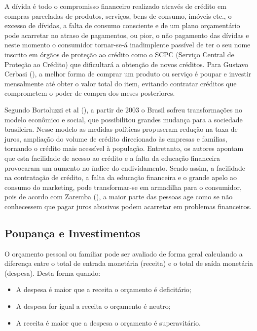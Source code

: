 A dívida é todo o compromisso financeiro realizado através de crédito em compras parceladas de produtos, serviços, bens de consumo, imóveis etc., o excesso de dívidas, a falta de consumo consciente e de um plano orçamentário pode acarretar no atraso de pagamentos, ou pior, o não pagamento das dívidas e neste momento o consumidor tornar-se-á inadimplente passível de ter o seu nome inscrito em órgãos de proteção ao crédito como o SCPC (Serviço Central de Proteção ao Crédito) que dificultará a obtenção de novos créditos. Para Gustavo Cerbasi (\citeyear{cerbasi2015}), a melhor forma de comprar um produto ou serviço é poupar e investir mensalmente até obter o valor total do item, evitando contratar créditos que comprometem o poder de compra dos meses posteriores.

Segundo Bortoluzzi et al (\citeyear{bortoluzzi2015}), a partir de 2003 o Brasil sofreu transformações no modelo econômico e social, que possibilitou grandes mudança para a sociedade brasileira. Nesse modelo as medidas políticas propuseram redução na taxa de juros, ampliação do volume de crédito direcionado às empresas e famílias, tornando o crédito mais acessível à população. Entretanto, os autores apontam que esta facilidade de acesso ao crédito e a falta da educação financeira provocaram um aumento no índice do endividamento. Sendo assim, a facilidade na contratação de crédito, a falta da educação financeira e o grande apelo ao consumo do marketing, pode transformar-se em armadilha para o consumidor, pois de acordo com Zaremba (\citeyear{zaremba2007}), a maior parte das pessoas age como se não conhecessem que pagar juros abusivos podem acarretar em problemas financeiros.

\subsection{Poupança e Investimentos}
O orçamento pessoal ou familiar pode ser avaliado de forma geral calculando a diferença entre o total de entrada monetária (receita) e o total de saída monetária (despesa). Desta forma quando:
\begin{itemize}
    \item A despesa é maior que a receita o orçamento é deficitário;
    \item A despesa for igual a receita o orçamento é neutro;
    \item A receita é maior que a despesa o orçamento é superavitário.
\end{itemize}

